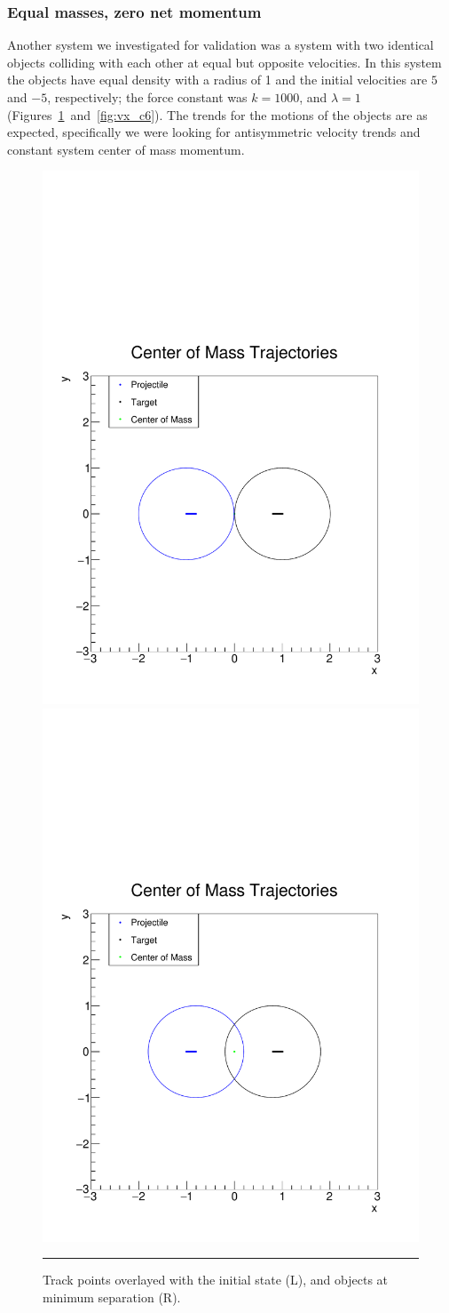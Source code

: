 \documentclass[aps,prl,floatfix,preprint,nofootinbib]{revtex4}
\begin{document}
\subsubsection{Equal masses, zero net momentum}
Another system we investigated for validation was a system with two identical objects colliding with each other at equal but opposite velocities. In this system the objects have equal density with a radius of 1 and the initial velocities are $5$ and $-5$, respectively; the force constant was $k = 1000$, and $\lambda = 1$ (Figures~\ref{fig:tracks_c6}~and~\ref{fig:vx_c6}). The trends for the motions of the objects are as expected, specifically we were looking for antisymmetric velocity trends and constant system center of mass momentum.
\begin{figure}[h!]
  \includegraphics[width=.45\textwidth]{plots/out_c6/x_vs_y_with_ellipse.pdf}
  \includegraphics[width=.45\textwidth]{plots/out_c6/x_vs_y_with_ellipse_MS.pdf}
                  {\par\nobreak\rule[9pt]{35em}{0.5pt}\vspace{-5mm}}
                  \caption{Track points overlayed with the initial state (L), and objects at minimum separation (R).}
                  \label{fig:tracks_c6}
\end{figure}
\end{document}
